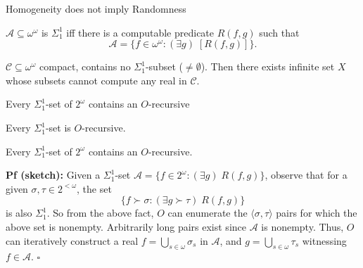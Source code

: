 \begin{frame}{Homogeneity does not imply Randomness}
  \begin{center}
  \end{center}

  \begin{define*}
    $\mathcal{A}\subseteq\omega^\omega$ is $\Sigma_1^1$ iff there is a
    computable predicate $R(f,g)$ such that
    \[\mathcal{A} =\{f\in\omega^\omega: (\exists g)\; [R(f,g)]\}.\]
  \end{define*}

  \begin{main-thm*}
    $\mathcal{C}\subseteq\omega^\omega$ compact, contains no
    $\Sigma_1^1$-subset ($\neq\emptyset$). Then there exists infinite set
    $X$ whose subsets cannot compute any real in $\mathcal{C}$.
  \end{main-thm*}
\end{frame}

\begin{frame}{Every $\Sigma_1^1$-set of $2^\omega$ contains an $O$-recursive}
  \begin{fact}
    Every $\Sigma^1_1$-set is $O$-recursive.
  \end{fact}

  \begin{lemma}
    Every $\Sigma_1^1$-set of $2^\omega$ contains an $O$-recursive.
  \end{lemma}

  \textbf{Pf (sketch):} Given a $\Sigma_1^1$-set $\mathcal{A}
  =\{f\in2^\omega: (\exists g)\; R(f,g)\}$, observe that for a given
  $\sigma,\tau\in 2^{<\omega}$, the set
  \[\{f\succ \sigma: (\exists g\succ\tau)\; R(f,g)\}\]
  is also $\Sigma^1_1$. So from the above fact, $O$ can enumerate the
  $\langle \sigma,\tau \rangle$ pairs for which the above set is nonempty.
  Arbitrarily long pairs exist since $\mathcal{A}$ is nonempty. Thus, $O$
  can iteratively construct a real $f=\bigcup_{s\in\omega} \sigma_s$ in
  $\mathcal{A}$, and $g=\bigcup_{s\in\omega} \tau_s$ witnessing
  $f\in\mathcal{A}$. $\square$
\end{frame}

